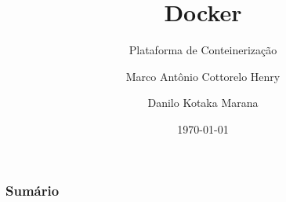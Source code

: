 \documentclass{beamer}
\title{Docker}
\subtitle{Plataforma de Conteinerização}
\author[Marco, DKM]{Marco Antônio Cottorelo Henry\inst{1} \and Danilo Kotaka Marana\inst{2}}
\institute[UEL]{Universidade Estadual De Londrina}
\date{\today}
\begin{document}
  \frame{\titlepage}

  \begin{frame}
    \frametitle{Sumário}
    \tableofcontents
  \end{frame}

  
  
  
  
  
  

  
  
  
  
  
  

  
  
  

  
  
  

  
\end{document}

